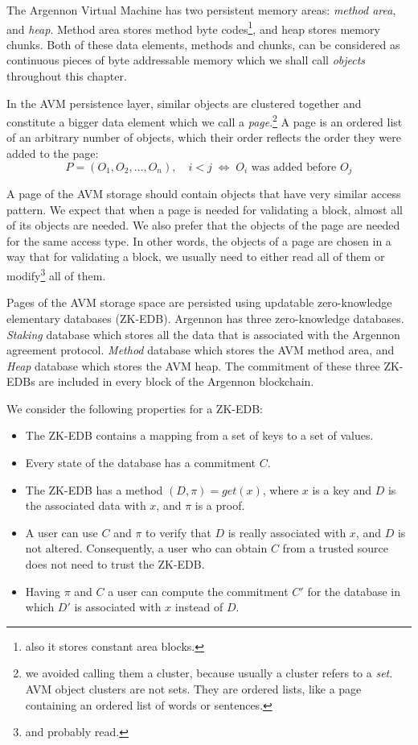 

The Argennon Virtual Machine has two persistent memory areas: \emph{method area}, and \emph{heap}. Method area stores
method byte codes\footnote{also it stores constant area blocks.}, and heap stores memory chunks. Both of these
data elements, methods and chunks, can be considered as continuous pieces of byte addressable memory
which we shall call \emph{objects} throughout this chapter.

In the AVM persistence layer, similar objects are clustered together and constitute a bigger data element which we call a
\emph{page}.\footnote{we avoided calling them a cluster, because usually a cluster refers to a \emph{set}. AVM object
clusters are not sets. They are ordered lists, like a page containing an ordered list of words or sentences.}
A page is an ordered list of an arbitrary number of objects, which their order reflects the order they were added to
the page:
\[
    P = (O_1,O_2,\dots,O_n),\quad i < j \; \Leftrightarrow \; \textrm{$O_i$ was added before $O_j$}
\]

A page of the AVM storage should contain objects that have very similar access pattern. We expect that when a page
is needed for validating a block, almost all of its objects are needed. We also prefer that the objects of the page
are needed for the same access type. In other words, the objects of a page are chosen in a way that
for validating a block, we usually need to either read all of them or modify\footnote{and probably read.} all of them.

Pages of the AVM storage space are persisted using updatable zero-knowledge elementary databases (ZK-EDB). Argennon
has three zero-knowledge databases. \emph{Staking} database which stores all the data that is associated with
the Argennon agreement protocol. \emph{Method} database which stores the AVM method area, and \emph{Heap} database which
stores the AVM heap. The commitment of these three ZK-EDBs are included in every block of the Argennon blockchain.

We consider the following properties for a ZK-EDB:
\begin{itemize}
    \item The ZK-EDB contains a mapping from a set of keys to a set of values.
    \item Every state of the database has a commitment \(C\).
    \item The ZK-EDB has a method \((D, \pi) = get(x)\), where \(x\) is a key and \(D\) is the associated data
    with \(x\), and \(\pi\) is a proof.
    \item A user can use \(C\) and \(\pi\) to verify that \(D\) is really associated with \(x\), and \(D\) is not
    altered. Consequently, a user who can obtain \(C\) from a trusted source does not need to trust the ZK-EDB\@.
    \item Having \(\pi\) and \(C\) a user can compute the commitment \(C'\) for the database in which \(D'\) is
    associated with \(x\) instead of \(D\).
\end{itemize}

